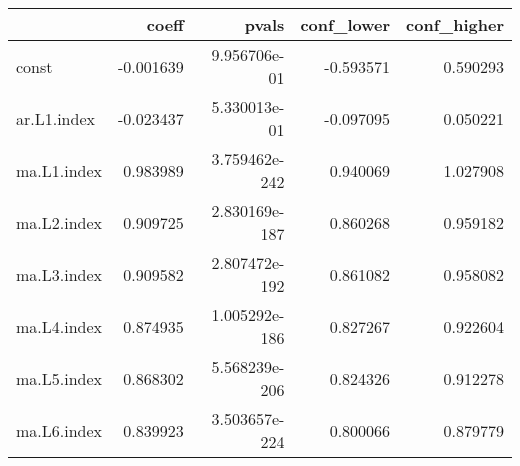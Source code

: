\begin{tabular}{lrrrr}
\toprule
{} &     coeff &          pvals &  conf\_lower &  conf\_higher \\
\midrule
const       & -0.001639 &   9.956706e-01 &   -0.593571 &     0.590293 \\
ar.L1.index & -0.023437 &   5.330013e-01 &   -0.097095 &     0.050221 \\
ma.L1.index &  0.983989 &  3.759462e-242 &    0.940069 &     1.027908 \\
ma.L2.index &  0.909725 &  2.830169e-187 &    0.860268 &     0.959182 \\
ma.L3.index &  0.909582 &  2.807472e-192 &    0.861082 &     0.958082 \\
ma.L4.index &  0.874935 &  1.005292e-186 &    0.827267 &     0.922604 \\
ma.L5.index &  0.868302 &  5.568239e-206 &    0.824326 &     0.912278 \\
ma.L6.index &  0.839923 &  3.503657e-224 &    0.800066 &     0.879779 \\
\bottomrule
\end{tabular}
